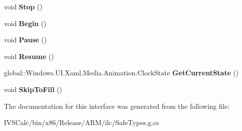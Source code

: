 \begin{DoxyCompactItemize}
void {\bfseries Stop} ()
\item 
\mbox{\label{interface_windows_1_1_u_i_1_1_xaml_1_1_media_1_1_animation_1_1_i_storyboard_acecbf19b19efcd680ab801ea7583213d}} 
void {\bfseries Begin} ()
\item 
\mbox{\label{interface_windows_1_1_u_i_1_1_xaml_1_1_media_1_1_animation_1_1_i_storyboard_ab6962da9d22e4e6074b1b55d16e501c6}} 
void {\bfseries Pause} ()
\item 
\mbox{\label{interface_windows_1_1_u_i_1_1_xaml_1_1_media_1_1_animation_1_1_i_storyboard_ac730df45ba536de8f998a9a99c6995d6}} 
void {\bfseries Resume} ()
\item 
\mbox{\label{interface_windows_1_1_u_i_1_1_xaml_1_1_media_1_1_animation_1_1_i_storyboard_a921af38756f68389523f29696421dc20}} 
global\+::\+Windows.\+U\+I.\+Xaml.\+Media.\+Animation.\+Clock\+State {\bfseries Get\+Current\+State} ()
\item 
\mbox{\label{interface_windows_1_1_u_i_1_1_xaml_1_1_media_1_1_animation_1_1_i_storyboard_a2e94db3f45b7a46b539a78a132a85d7e}} 
void {\bfseries Skip\+To\+Fill} ()
\end{DoxyCompactItemize}


The documentation for this interface was generated from the following file\+:\begin{DoxyCompactItemize}
\item 
I\+V\+S\+Calc/bin/x86/\+Release/\+A\+R\+M/ilc/Safe\+Types.\+g.\+cs\end{DoxyCompactItemize}
